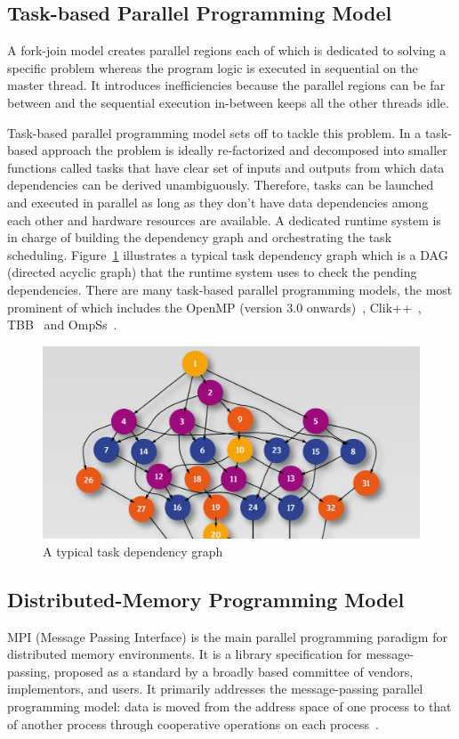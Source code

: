 \subsection{Task-based Parallel Programming Model}
A fork-join model creates parallel regions each of which is dedicated to solving 
a specific problem whereas the program logic is executed in sequential on the 
master thread. It introduces inefficiencies because the parallel regions can be 
far between and the sequential execution in-between keeps all the other threads 
idle. 

Task-based parallel programming model sets off to tackle this problem. In a 
task-based approach the problem is ideally re-factorized and decomposed into 
smaller functions called tasks that have clear set of inputs and outputs from 
which data dependencies can be derived unambiguously. Therefore, tasks can be 
launched and executed in parallel as long as they don't have data dependencies 
among each other and hardware resources are available. A dedicated runtime 
system is in charge of building the dependency graph and orchestrating the task 
scheduling. Figure~\ref{fig:task-dependency} illustrates a typical task 
dependency graph which is a DAG (directed acyclic graph) that the runtime system 
uses to check the pending dependencies. There are many task-based parallel 
programming models, the most prominent of which includes the OpenMP (version 3.0 
onwards)~\cite{OpenMP4.0}, Clik++~\cite{clik}, TBB~\cite{tbb} and 
OmpSs~\cite{ompss}.

\begin{figure}[H]
    \centerline{\includegraphics[scale=0.50]{background/figs/starss.png}}
    \caption{A typical task dependency graph}
    \label{fig:task-dependency}
\end{figure}

\subsection{Distributed-Memory Programming Model}
MPI (Message Passing Interface) is the main parallel programming paradigm for 
distributed memory environments. It is a library specification for 
message-passing, proposed as a standard by a broadly based committee of vendors, 
implementors, and users. It primarily addresses the message-passing parallel 
programming model: data is moved from the address space of one process to that 
of another process through cooperative operations on each 
process~\cite{llnl_mpi}.

